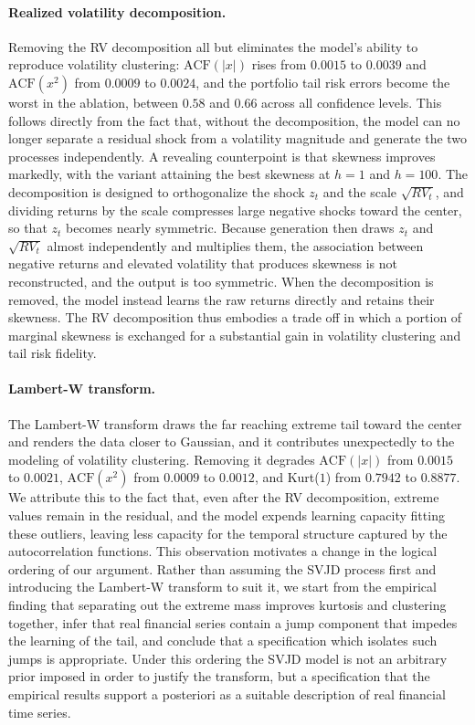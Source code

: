 \documentclass[sigconf,natbib=false]{acmart}
\begin{document}
\paragraph{Realized volatility decomposition.}
Removing the RV decomposition all but eliminates the model's ability to reproduce volatility clustering: $\mathrm{ACF}(|x|)$ rises from $0.0015$ to $0.0039$ and $\mathrm{ACF}(x^{2})$ from $0.0009$ to $0.0024$, and the portfolio tail risk errors become the worst in the ablation, between $0.58$ and $0.66$ across all confidence levels. This follows directly from the fact that, without the decomposition, the model can no longer separate a residual shock from a volatility magnitude and generate the two processes independently. A revealing counterpoint is that skewness improves markedly, with the variant attaining the best skewness at $h = 1$ and $h = 100$. The decomposition is designed to orthogonalize the shock $z_t$ and the scale $\sqrt{RV_t}$, and dividing returns by the scale compresses large negative shocks toward the center, so that $z_t$ becomes nearly symmetric. Because generation then draws $z_t$ and $\sqrt{RV_t}$ almost independently and multiplies them, the association between negative returns and elevated volatility that produces skewness is not reconstructed, and the output is too symmetric. When the decomposition is removed, the model instead learns the raw returns directly and retains their skewness. The RV decomposition thus embodies a trade off in which a portion of marginal skewness is exchanged for a substantial gain in volatility clustering and tail risk fidelity.

\paragraph{Lambert-W transform.}
The Lambert-W transform draws the far reaching extreme tail toward the center and renders the data closer to Gaussian, and it contributes unexpectedly to the modeling of volatility clustering. Removing it degrades $\mathrm{ACF}(|x|)$ from $0.0015$ to $0.0021$, $\mathrm{ACF}(x^{2})$ from $0.0009$ to $0.0012$, and Kurt($1$) from $0.7942$ to $0.8877$. We attribute this to the fact that, even after the RV decomposition, extreme values remain in the residual, and the model expends learning capacity fitting these outliers, leaving less capacity for the temporal structure captured by the autocorrelation functions. This observation motivates a change in the logical ordering of our argument. Rather than assuming the SVJD process first and introducing the Lambert-W transform to suit it, we start from the empirical finding that separating out the extreme mass improves kurtosis and clustering together, infer that real financial series contain a jump component that impedes the learning of the tail, and conclude that a specification which isolates such jumps is appropriate. Under this ordering the SVJD model is not an arbitrary prior imposed in order to justify the transform, but a specification that the empirical results support a posteriori as a suitable description of real financial time series.
\end{document}
